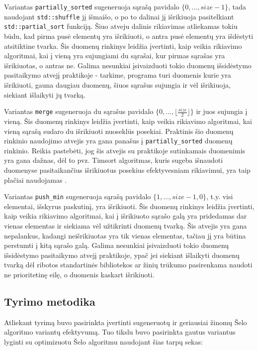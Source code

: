 \documentclass{VUMIFInfBakalaurinis}
\begin{document}
Variantas \verb|partially_sorted| sugeneruoja sąrašą pavidalo $\{0, \dots, size-1\}$,
tada naudojant \verb|std::shuffle| jį išmaišo, o po to dalinai jį išrikiuoja pasitelkiant \verb|std::partial_sort| funkciją.
Šiuo atveju dalinis rikiavimas atliekamas tokiu būdu, kad pirma pusė elementų yra išrikiuoti, o antra pusė elementų yra išdėstyti atsitiktine tvarka.
Šis duomenų rinkinys leidžia įvertinti, kaip veikia rikiavimo algoritmai, kai į vieną yra sujungiami du sąrašai, kur pirmas sąrašas yra išrikiuotas, o antras ne.
Galima nesunkiai įsivaizduoti tokio duomenų išsidėstymo pasitaikymo atvejį praktikoje - tarkime, programa turi duomenis kurie yra išrikiuoti,
gauna daugiau duomenų, šiuos sąrašus sujungia ir vėl išrikiuoja, siekiant išlaikyti jų tvarką.

Variantas \verb|merge| sugeneruoja du sąrašus pavidalo $\{0, \dots, \lfloor \frac{size}{2} \rfloor\}$ ir juos sujungia į vieną.
Šis duomenų rinkinys leidžia įvertinti, kaip veikia rikiavimo algoritmai, kai vieną sąrašą sudaro du išrikiuoti nuoseklūs posekiai.
Praktinis šio duomenų rinkinio naudojimo atvejis yra gana panašus į \verb|partially_sorted| duomenų rinkinio.
Reikia pastebėti, jog šis atvejis su praktikoje sutinkamais duomenimis yra gana dažnas, dėl to pvz.
Timsort algoritmas, kuris sugeba išnaudoti duomenyse pasitaikančius išrikiuotus posekius efektyvesniam rikiavimui, yra taip plačiai naudojamas \cite{auger2015merge}.

Variantas \verb|push_min| sugeneruoja sąrašą pavidalo $\{1, \dots, size-1, 0\}$, t.y. visi elementai, išskyrus paskutinį, yra išrikiuoti.
Šis duomenų rinkinys leidžia įvertinti, kaip veikia rikiavimo algoritmai, kai į išrikiuoto sąrašo galą yra pridedamas dar vienas elementas ir siekiama vėl užtikrinti duomenų tvarką.
Šis atvejis yra gana nepalankus, kadangi neišrikiuotas yra tik vienas elementas, tačiau jį yra būtina perstumti į kitą sąrašo galą.
Galima nesunkiai įsivaizduoti tokio duomenų išsidėstymo pasitaikymo atvejį praktikoje, ypač jei siekiant išlaikyti duomenų tvarką dėl ribotos standartinės bibliotekos ar
žinių trūkumo pasirenkama naudoti ne prioritetinę eilę, o duomenis kaskart išrikiuoti.

\subsection{Tyrimo metodika}

Atliekant tyrimą buvo pasirinkta įvertinti sugeneruotų ir geriausiai žinomų Šelo algoritmo variantų efektyvumą.
Tuo tikslu buvo pasirinkta gautus variantus lyginti su optimizuotu Šelo algoritmu naudojant šias tarpų sekas:
\end{document}
